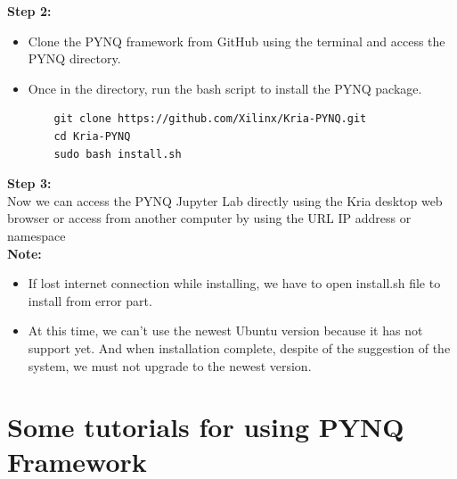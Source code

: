 \documentclass[a4paper, 12pt]{report}
\begin{document}
\textbf{Step 2:}
\begin{itemize}
    \item Clone the PYNQ framework from GitHub using the terminal and access the PYNQ directory.
    \item Once in the directory, run the bash script to install the PYNQ package.
    \begin{lstlisting}
    git clone https://github.com/Xilinx/Kria-PYNQ.git
    cd Kria-PYNQ
    sudo bash install.sh
    \end{lstlisting}
\end{itemize}

\textbf{Step 3:}\\

Now we can access the PYNQ Jupyter Lab directly using the Kria desktop web browser or access from another computer by using the URL IP address or namespace\\

\textbf{Note:}
\begin{itemize}
    \item If lost internet connection while installing, we have to open install.sh file to install from error part.
    \item At this time, we can't use the newest Ubuntu version because it has not support yet. And when installation complete, despite of the suggestion of the system, we must not upgrade to the newest version.
\end{itemize}

\chapter{Some tutorials for using PYNQ Framework}


\clearpage
{}
\printbibliography
\end{document}
